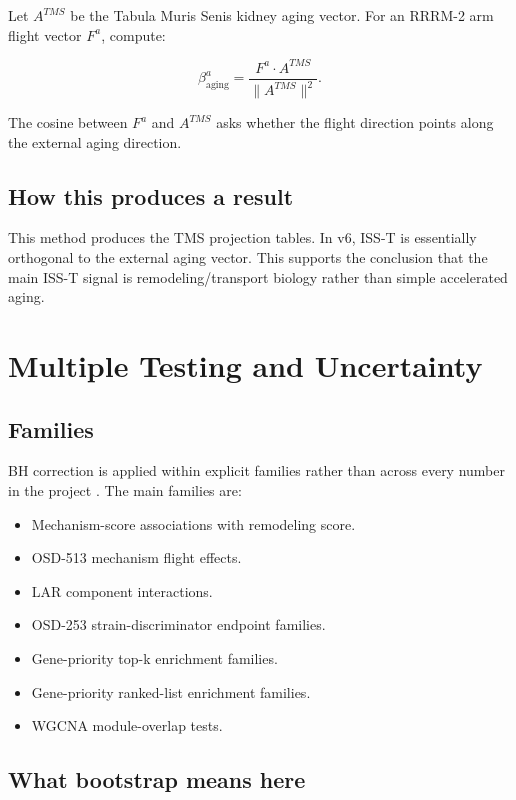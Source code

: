 \documentclass[11pt]{article}
\begin{document}
Let $A^{TMS}$ be the Tabula Muris Senis kidney aging vector. For an RRRM-2 arm flight vector $F^a$, compute:

\begin{equation}
\beta_{\mathrm{aging}}^a=\frac{F^a\cdot A^{TMS}}{\lVert A^{TMS}\rVert^2}.
\end{equation}

The cosine between $F^a$ and $A^{TMS}$ asks whether the flight direction points along the external aging direction.

\subsection{How this produces a result}

This method produces the TMS projection tables. In v6, ISS-T is essentially orthogonal to the external aging vector. This supports the conclusion that the main ISS-T signal is remodeling/transport biology rather than simple accelerated aging.

\section{Multiple Testing and Uncertainty}

\subsection{Families}

BH correction is applied within explicit families rather than across every number in the project \citep{benjamini1995controlling}. The main families are:

\begin{itemize}
  \item Mechanism-score associations with remodeling score.
  \item OSD-513 mechanism flight effects.
  \item LAR component interactions.
  \item OSD-253 strain-discriminator endpoint families.
  \item Gene-priority top-k enrichment families.
  \item Gene-priority ranked-list enrichment families.
  \item WGCNA module-overlap tests.
\end{itemize}

\subsection{What bootstrap means here}
\end{document}
